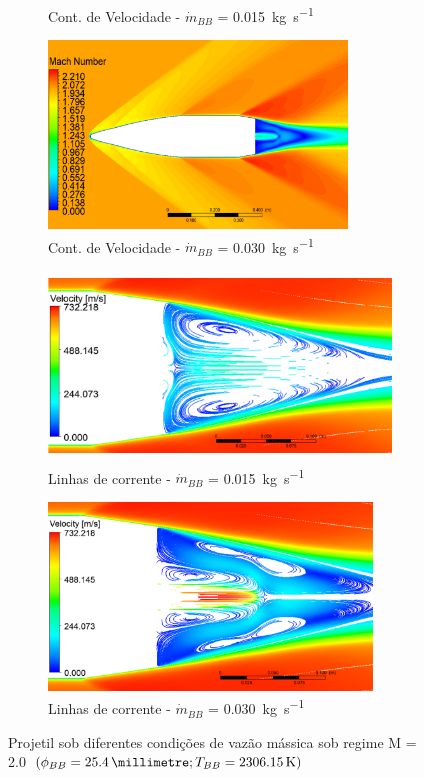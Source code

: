 \begin{figure}[!ht]
\begin{subfigure}[b]{0.47\textwidth}
        \caption{Cont. de Velocidade - \(\Dot{m}_{BB}\) = \qty{0,015}{\kilogram\per\second}}
        \label{fig:contorno-velocidade-bb-1pol-vazao0015}
    \end{subfigure}
    \hfill
	\begin{subfigure}[b]{0.47\textwidth}
        \centering
        \includegraphics[height=5cm,width=\textwidth]{contorno-velocidade-2306K-vazao-0030-1pol.png}
        \caption{Cont. de Velocidade - \(\Dot{m}_{BB}\) = \qty{0,030}{\kilogram\per\second}}
        \label{fig:contorno-velocidade-bb-1pol-vazao0030}
    \end{subfigure}
    \hfill
    \begin{subfigure}[b]{0.47\textwidth}
        \centering
        \includegraphics[height=5cm,width=\textwidth]{corrente-velocidade-2306K-vazao-0015-1pol.png}
        \caption{Linhas de corrente - \(\Dot{m}_{BB}\) = \qty{0,015}{\kilogram\per\second}}
        \label{fig:corrente-velocidade-bb-1pol-vazao0015}
    \end{subfigure}
    \hfill
    \begin{subfigure}[b]{0.47\textwidth}
        \centering
        \includegraphics[height=5cm,width=\textwidth]{corrente-velocidade-2306K-vazao-0030-1pol.png}
        \caption{Linhas de corrente - \(\Dot{m}_{BB}\) = \qty{0,030}{\kilogram\per\second}}
        \label{fig:corrente-velocidade-bb-1pol-vazao0030}
    \end{subfigure}
	\caption{Projetil sob diferentes condições de vazão mássica sob regime M = \num{2,0} \(\left(\phi_{BB} = \qty{25,4}{\millimetre}; T_{BB} = \qty{2306,15}{\kelvin}\right)\)}
	\label{fig:influencia-diametro-vazao-1pol}
\end{figure}

